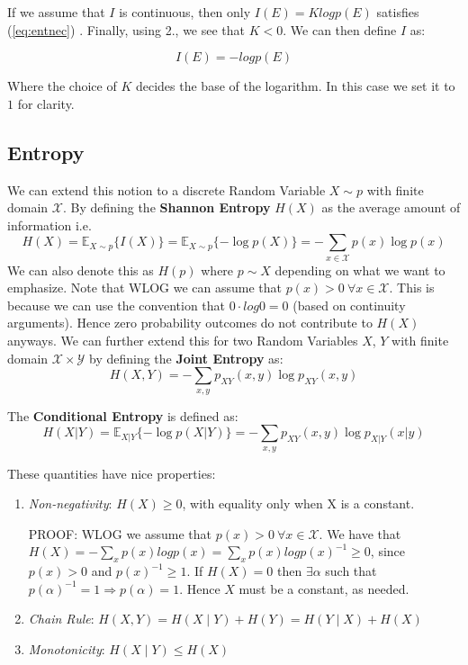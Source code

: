 \documentclass[]{article}
\theoremstyle{mattstyle}
\theoremstyle{definition}
\begin{document}
If we assume that $I$ is continuous, then only $I(E) = Klog p(E)$ satisfies (\ref{eq:entnec})  \cite{EntNotes}. Finally, using 2., we see that $K<0$. We can then define $I$ as:

\begin{equation}
I(E) = -log p(E)
\end{equation}

Where the choice of $K$ decides the base of the logarithm. In this case we set it to $1$ for clarity.

\subsection{Entropy}
We can extend this notion to a discrete Random Variable $X\sim p$ with finite domain $\mathcal{X}$. By defining the \textbf{Shannon Entropy} $H(X)$ as the average amount of information i.e. 
\begin{equation}
H(X) = \mathbb{E}_{X\sim p}\{I(X)\} = \mathbb{E}_{X\sim p}\{-\log p(X)\} = -\sum_{x\in\mathcal{X}}p(x)\log p(x)
\end{equation}
We can also denote this as $H(p)$ where $p \sim X$ depending on what we want to emphasize. Note that WLOG we can assume that \(p(x)>0 \ \forall x\in\mathcal{X}\). This is because we can use the convention that \(0\cdot log0 = 0\) (based on continuity arguments). Hence zero probability outcomes do not contribute to $H(X)$ anyways. We can further extend this for two Random Variables $X$, $Y$ with finite domain \(\mathcal{X}\times\mathcal{Y}\) by defining the \textbf{Joint Entropy} as:
\begin{equation}
H(X,Y) = -\sum_{x,y}p_{XY}(x,y)\log p_{XY}(x,y)
\end{equation}

The \textbf{Conditional Entropy} is defined as:
\begin{equation}
H(X|Y) = \mathbb{E}_{X|Y}\{-\log p(X|Y)\} = -\sum_{x,y}p_{XY}(x,y)\log p_{X|Y}(x|y)
\end{equation}

These quantities have nice properties:
\begin{enumerate}
	\item \emph{Non-negativity}: \(H(X)\ge0\), with equality only when X is a constant.
	
	PROOF: WLOG we assume that \(p(x)>0 \ \forall x\in\mathcal{X}\). We have that \(H(X) = -\sum_{x} p(x)logp(x) = \sum_{x} p(x)logp(x)^{-1}\ge0\), since \(p(x)>0\) and \(p(x)^{-1} \ge 1\). If \(H(X)=0\) then \(\exists \alpha\) such that \(p(\alpha)^{-1}=1 \Rightarrow p(\alpha)=1\). Hence \(X\) must be a constant, as needed.
	
	\item \emph{Chain Rule}: $H(X,Y) = H(X \mid Y) + H(Y) = H(Y \mid X) + H(X)$ 
	\item \emph{Monotonicity}: $H(X\mid Y) \le H(X)$ 
\end{enumerate}
\end{document}

